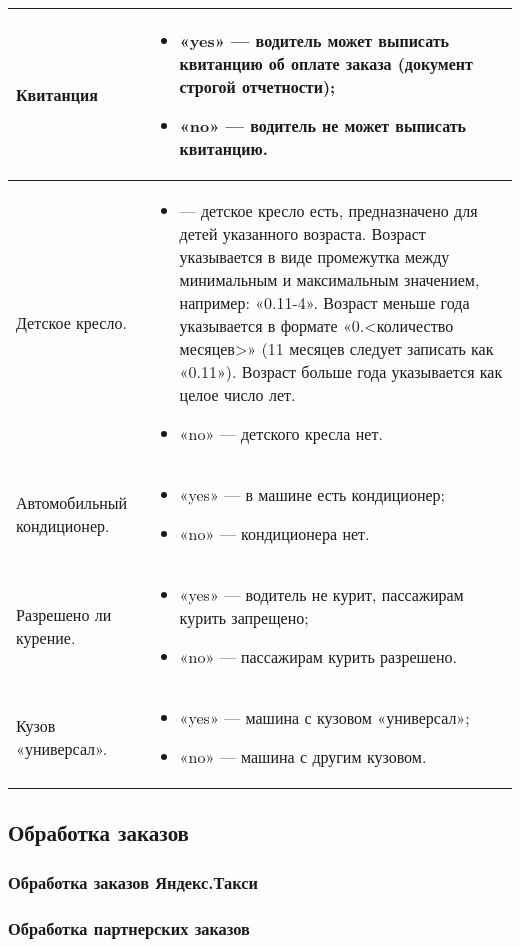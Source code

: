 \begin{longtable}{|p{4cm}|p{9cm}|}
					\hline	Квитанция & \begin{itemize} 
											\item «yes» — водитель может выписать квитанцию об оплате заказа (документ строгой отчетности);
											\item «no» — водитель не может выписать квитанцию.
										\end{itemize} \\ [2mm]
					\hline	Детское кресло. & 	\begin{itemize} 
													\item <возраст ребенка> — детское кресло есть, предназначено для детей указанного возраста. Возраст указывается в виде промежутка между минимальным и максимальным значением, например: «0.11-4». Возраст меньше года указывается в формате «0.<количество месяцев>» (11 месяцев следует записать как «0.11»). Возраст больше года указывается как целое число лет.
													\item «no» — детского кресла нет.
												\end{itemize} \\ [2mm]
					\hline	Автомобильный кондиционер. & 	\begin{itemize} 
																\item «yes» — в машине есть кондиционер;
																\item «no» — кондиционера нет.
															\end{itemize} \\ [2mm]
					\hline	Разрешено ли курение. & \begin{itemize} 
														\item «yes» — водитель не курит, пассажирам курить запрещено;
														\item «no» — пассажирам курить разрешено.
													\end{itemize} \\ [2mm]
					\hline	Кузов «универсал». &\begin{itemize} 
													\item «yes» — машина с кузовом «универсал»;
													\item «no» — машина с другим кузовом.
												\end{itemize}  \\ [2mm]
					\hline 
				\end{longtable}

	\subsection{Обработка заказов}

		\subsubsection{Обработка заказов Яндекс.Такси}

		\subsubsection{Обработка партнерских заказов}
